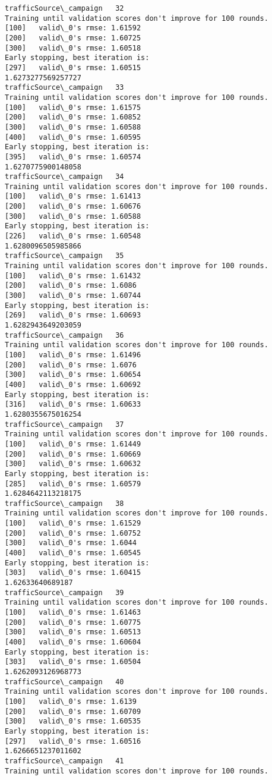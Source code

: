 \documentclass[11pt]{article}
\begin{document}
\begin{Verbatim}[commandchars=\\\{\}]
trafficSource\_campaign   32
Training until validation scores don't improve for 100 rounds.
[100]	valid\_0's rmse: 1.61592
[200]	valid\_0's rmse: 1.60725
[300]	valid\_0's rmse: 1.60518
Early stopping, best iteration is:
[297]	valid\_0's rmse: 1.60515
1.6273277569257727
trafficSource\_campaign   33
Training until validation scores don't improve for 100 rounds.
[100]	valid\_0's rmse: 1.61575
[200]	valid\_0's rmse: 1.60852
[300]	valid\_0's rmse: 1.60588
[400]	valid\_0's rmse: 1.60595
Early stopping, best iteration is:
[395]	valid\_0's rmse: 1.60574
1.6270775900148058
trafficSource\_campaign   34
Training until validation scores don't improve for 100 rounds.
[100]	valid\_0's rmse: 1.61413
[200]	valid\_0's rmse: 1.60676
[300]	valid\_0's rmse: 1.60588
Early stopping, best iteration is:
[226]	valid\_0's rmse: 1.60548
1.6280096505985866
trafficSource\_campaign   35
Training until validation scores don't improve for 100 rounds.
[100]	valid\_0's rmse: 1.61432
[200]	valid\_0's rmse: 1.6086
[300]	valid\_0's rmse: 1.60744
Early stopping, best iteration is:
[269]	valid\_0's rmse: 1.60693
1.6282943649203059
trafficSource\_campaign   36
Training until validation scores don't improve for 100 rounds.
[100]	valid\_0's rmse: 1.61496
[200]	valid\_0's rmse: 1.6076
[300]	valid\_0's rmse: 1.60654
[400]	valid\_0's rmse: 1.60692
Early stopping, best iteration is:
[316]	valid\_0's rmse: 1.60633
1.6280355675016254
trafficSource\_campaign   37
Training until validation scores don't improve for 100 rounds.
[100]	valid\_0's rmse: 1.61449
[200]	valid\_0's rmse: 1.60669
[300]	valid\_0's rmse: 1.60632
Early stopping, best iteration is:
[285]	valid\_0's rmse: 1.60579
1.6284642113218175
trafficSource\_campaign   38
Training until validation scores don't improve for 100 rounds.
[100]	valid\_0's rmse: 1.61529
[200]	valid\_0's rmse: 1.60752
[300]	valid\_0's rmse: 1.6044
[400]	valid\_0's rmse: 1.60545
Early stopping, best iteration is:
[303]	valid\_0's rmse: 1.60415
1.62633640689187
trafficSource\_campaign   39
Training until validation scores don't improve for 100 rounds.
[100]	valid\_0's rmse: 1.61463
[200]	valid\_0's rmse: 1.60775
[300]	valid\_0's rmse: 1.60513
[400]	valid\_0's rmse: 1.60604
Early stopping, best iteration is:
[303]	valid\_0's rmse: 1.60504
1.6262093126968773
trafficSource\_campaign   40
Training until validation scores don't improve for 100 rounds.
[100]	valid\_0's rmse: 1.6139
[200]	valid\_0's rmse: 1.60709
[300]	valid\_0's rmse: 1.60535
Early stopping, best iteration is:
[297]	valid\_0's rmse: 1.60516
1.6266651237011602
trafficSource\_campaign   41
Training until validation scores don't improve for 100 rounds.

\end{Verbatim}
\end{document}
